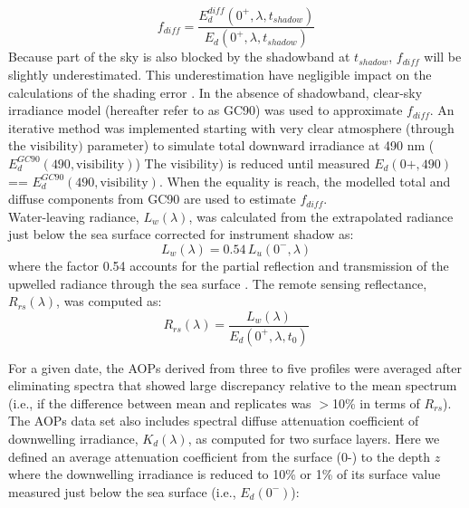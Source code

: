 \documentclass[essd, manuscript]{copernicus}
\begin{document}
\begin{equation}
 \label{eq:diffuseEd}
f_{diff} = \frac{E_d^{diff}(0^+,\lambda,t_{shadow})}{E_d(0^+,\lambda,t_{shadow})}
\end{equation}
Because part of the sky is also blocked by the shadowband at $t_{shadow}$, $f_{diff}$ will be slightly underestimated. This underestimation have negligible impact on the calculations of the shading error \citep{Belanger2017}. In the absence of shadowband, \citet{Gregg1990} clear-sky irradiance model (hereafter refer to as GC90) was used to approximate $f_{diff}$. An iterative method was implemented starting with very clear atmosphere (through the $\mathrm{visibility})$ parameter) to simulate total downward irradiance at 490 nm ($E_d^{GC90}(490, \mathrm{visibility})$)  The $\mathrm{visibility})$ is reduced until measured $E_d(0+,490)$ == $E_d^{GC90}(490, \mathrm{visibility})$. When the equality is reach, the modelled total and diffuse components from GC90 are used to estimate $f_{diff}$. \\ 

Water-leaving radiance, $L_w(\lambda)$, was calculated from the extrapolated radiance just below the sea surface corrected for instrument shadow as:
 \begin{equation}
 \label{eq:L_w}
L_w(\lambda) = 0.54\,L_u(0^-,\lambda)
\end{equation}
where the factor 0.54 accounts for the partial reflection and transmission of the upwelled radiance through the sea surface \citep{Mueller2003}. 
The remote sensing reflectance, $R_{rs}(\lambda)$, was computed as:
 \begin{equation}
 \label{eq:Rrs}
R_{rs}(\lambda) = \frac{L_w(\lambda)}{E_d(0^+,\lambda,t_0)} 
\end{equation}

For a given date, the AOPs derived from three to five profiles were averaged after eliminating spectra that showed large discrepancy relative to the mean spectrum (i.e., if the difference between mean and replicates was $>$10\% in terms of $R_{rs}$).\\  

The AOPs data set also includes spectral diffuse attenuation coefficient of downwelling irradiance, $K_d(\lambda)$, as computed for two surface layers. Here we defined an average attenuation coefficient from the surface (0-) to the depth $z$ where the downwelling irradiance is reduced to 10\% or 1\% of its surface value measured just below the sea surface (i.e., $E_d(0^-)$):  
\end{document}
